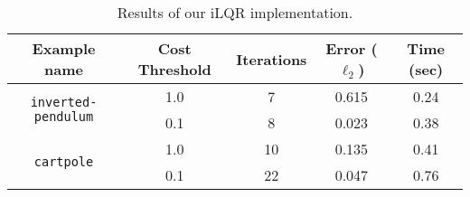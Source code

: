 \documentclass[nodate]{../cs-classes/cs-classes}
\begin{document}
\begin{table}[htbp]
    \centering
    \begin{tabular}{ccccc}
        \toprule
        Example name                                & Cost Threshold & Iterations & Error ($\ell_2$) & Time (sec) \\
        \midrule
        \multirow{2}{*}{\texttt{inverted-pendulum}} & 1.0            & 7          & 0.615            & 0.24       \\
                                                    & 0.1            & 8          & 0.023            & 0.38       \\
        \multirow{2}{*}{\texttt{cartpole}}          & 1.0            & 10         & 0.135            & 0.41       \\
                                                    & 0.1            & 22         & 0.047            & 0.76       \\
        \bottomrule
    \end{tabular}
    \caption{Results of our iLQR implementation.}
    \label{table:perf}
\end{table}
\end{document}
